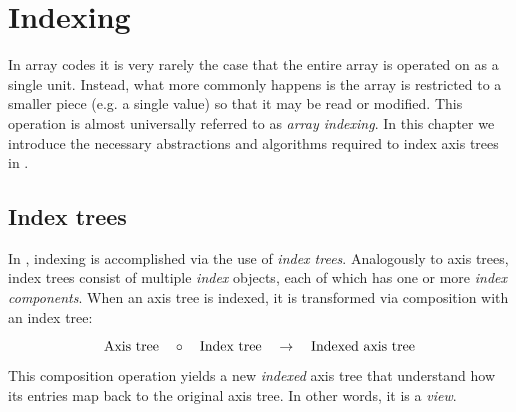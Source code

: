 \documentclass[thesis]{subfiles}
\begin{document}
\chapter{Indexing}
\label{chapter:indexing}


In array codes it is very rarely the case that the entire array is operated on as a single unit.
Instead, what more commonly happens is the array is restricted to a smaller piece (e.g. a single value) so that it may be read or modified.
This operation is almost universally referred to as \textit{array indexing}.
In this chapter we introduce the necessary abstractions and algorithms required to index axis trees in .

\section{Index trees}
\label{sec:index_trees}

In , indexing is accomplished via the use of \textit{index trees}.
Analogously to axis trees, index trees consist of multiple \textit{index} objects, each of which has one or more \textit{index components}.
When an axis tree is indexed, it is transformed via composition with an index tree:

\begin{equation*}
  \textnormal{Axis tree} \quad \circ \quad \textnormal{Index tree} \quad \to \quad \textnormal{Indexed axis tree}
\end{equation*}

This composition operation yields a new \textit{indexed} axis tree that understand how its entries map back to the original axis tree.
In other words, it is a \textit{view}.
\end{document}
